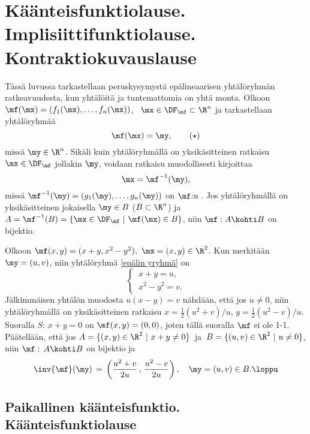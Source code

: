 \section[Käänteisfunktiolause. Implisiittifunktiolause. \\ Kontraktiokuvauslause]
{Käänteisfunktiolause. Implisiittifunktiolause. \\ Kontraktiokuvauslause}
\label{käänteisfunktiolause} 
\alku

Tässä luvussa tarkastellaan peruskysymystä epälineaarisen yhtälöryhmän ratkeavuudesta, kun 
yhtälöitä ja tuntemattomia on yhtä monta. Olkoon $\mf(\mx)=(f_1(\mx),\ldots,f_n(\mx))$, \
$\mx\in\DF_\mf\subset\R^n$ ja tarkastellaan yhtälöryhmää
\begin{equation} \label{epälin yryhmä}
\mf(\mx)=\my, \tag{$\star$}
\end{equation}
missä $\my\in\R^n$. Sikäli kuin yhtälöryhmällä on yksikäsitteinen ratkaisu $\mx\in\DF_\mf$
jollakin $\my$, voidaan ratkaisu muodollisesti kirjoittaa
\[
\mx = \mf^{-1}(\my),
\]
missä $\mf^{-1}(\my)=(g_1(\my),\ldots,g_n(\my))$ on $\mf$:n . Jos
yhtälöryhmällä on yksikäsitteinen jokaisella $\my \in B$ ($B\subset\R^n$) ja
$A=\mf^{-1}(B)=\{\mx\in\DF_\mf\ | \ \mf(\mx) \in B\}$, niin $\mf: A \kohti B$ on bijektio.
\begin{Exa} \label{udif-7: esim 1} Olkoon $\mf(x,y)=(x+y,x^2-y^2),\ \mx=(x,y)\in\R^2$. Kun
merkitään $\my=(u,v)$, niin yhtälöryhmä \eqref{epälin yryhmä} on
\[
\begin{cases} \,x+y =u, \\ \,x^2-y^2 =v. \end{cases}
\]
Jälkimmäisen yhtälön muodosta $u(x-y)=v$ nähdään, että jos $u \neq 0$, niin yhtälöryhmällä on
yksikäsitteinen ratkaisu $x=\frac{1}{2}(u^2+v)/u$, $y=\frac{1}{2}(u^2-v)/u$. Suoralla
$S:\,x+y=0$ on $\mf(x,y)=(0,0)$, joten tällä suoralla $\mf$ ei ole 1-1. Päätellään, että jos
$A=\{(x,y)\in\R^2\ | \ x+y \neq 0\}\,$ ja $\,B=\{(u,v)\in\R^2\ |\ u \neq 0\}$, niin
$\mf:\,A \kohti B$ on bijektio ja
\[
\inv{\mf}(\my) \,=\, \left(\frac{u^2+v}{2u}\,,\,\frac{u^2-v}{2u}\right), \quad 
                     \my = (u,v) \in B. \loppu
\]
\end{Exa}

\subsection{Paikallinen käänteisfunktio. Käänteisfunktiolause}

